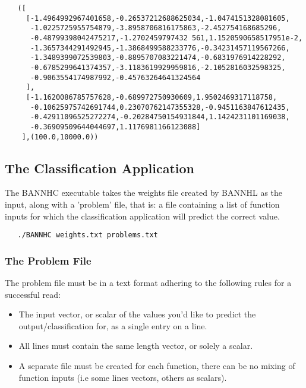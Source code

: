 \documentclass[a4paper]{article}
\newenvironment{code}{\captionsetup{type=listing}}{}
\begin{document}
\begin{code}
   \begin{verbatim}
   ([
     [-1.4964992967401658,-0.26537212688625034,-1.0474151328081605,
      -1.0225725955754879,-3.8958706816175863,-2.452754168685296,
      -0.48799398042475217,-1.2702459797432 561,1.1520590658517951e-2,
      -1.3657344291492945,-1.3868499588233776,-0.34231457119567266,
      -1.3489399072539803,-0.8895707083221474,-0.6831976914228292,
      -0.6785299641374357,-3.1183619929959816,-2.1052816032598325,
      -0.9063554174987992,-0.45763264641324564
     ],
     [-1.1620086785757628,-0.689972750930609,1.9502469317118758,
      -0.10625975742691744,0.23070762147355328,-0.9451163847612435,
      -0.42911096525272274,-0.20284750154931844,1.1424231101169038,
      -0.36909509644044697,1.1176981166123088]
    ],(100.0,10000.0))
   \end{verbatim}
\end{code}

\subsection{The Classification Application}
The BANNHC executable takes the weights file created by BANNHL as the input,
along with a 'problem' file, that is: a file containing a list of function
inputs for which the classification application will predict the correct value.

\begin{code}
   \begin{verbatim}
   ./BANNHC weights.txt problems.txt
   \end{verbatim}
\end{code}


\subsubsection{The Problem File}
The problem file must be in a text format adhering to the following rules for a
successful read:
\begin{itemize}
   \item The input vector, or scalar of the values you'd like to predict the
      output/classification for, as a single entry on a line.
   \item All lines must contain the same length vector, or solely a scalar.
   \item A separate file must be created for each function, there can be no
      mixing of function inputs (i.e some lines vectors, others as scalars).
\end{itemize}
\end{document}
